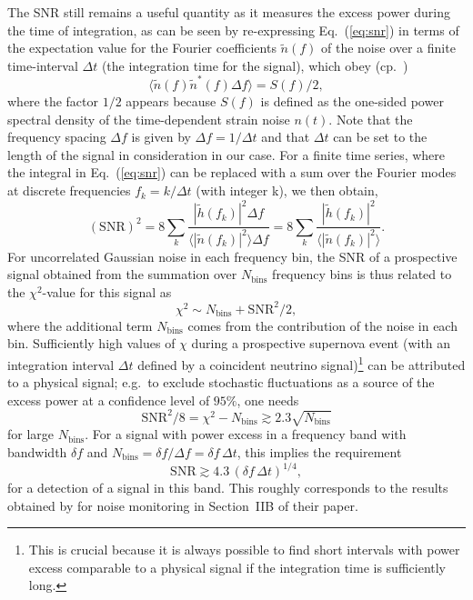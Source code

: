 The SNR still remains a
useful quantity as it measures the excess power during the time of
integration, as can be seen by re-expressing Eq.~(\ref{eq:snr}) in
terms of the expectation value for the Fourier coefficients
$\tilde{n}(f)$ of the noise over a finite time-interval $\Delta t$
(the integration time for the signal),
which obey (cp.\ \citealp{logue_12})
\begin{equation}
\langle\tilde{n}(f)\tilde{n}^*(f) \Delta f\rangle=S(f)/2,
\end{equation}
where the factor $1/2$ appears because $S(f)$ is defined as the one-sided power
spectral density of the time-dependent strain noise $n(t)$.
Note that the frequency spacing $\Delta f$ is given by $\Delta f=
1/\Delta t$ and that $\Delta t$ can be set to the length of the
signal in consideration in our case.
For a finite time series, where the integral in 
Eq.~(\ref{eq:snr}) can be replaced with a sum over the Fourier modes
at discrete frequencies $f_k=k/\Delta t$ (with integer k), we then obtain,
\begin{equation}
(\mathrm{SNR})^2=
8\sum_k \frac{|\tilde{h}(f_k)|^2 \Delta f}{\langle |\tilde{n}(f_k)|^2\rangle \Delta f}
=8\sum_k \frac{|\tilde{h}(f_k)|^2 }{\langle |\tilde{n}(f_k)|^2\rangle}.
\end{equation}
For uncorrelated Gaussian noise in each frequency bin, the SNR of a
prospective signal obtained from the summation over $N_\mathrm{bins}$
frequency bins is thus related to the $\chi^2$-value for this signal
as
\begin{equation}
\chi^2\sim N_\mathrm{bins}+\mathrm{SNR}^2/2,
\end{equation}
where the additional term $N_\mathrm{bins}$ comes from the
contribution of the noise in each bin. Sufficiently high values of
$\chi$ during a prospective supernova event (with an integration
interval  $\Delta t$ defined by a coincident neutrino signal)\footnote{This is
  crucial because it is always possible to find short intervals with
  power excess comparable to a physical signal if the integration time
  is sufficiently long.} can be attributed to a physical signal;
e.g.\ to exclude stochastic fluctuations as a source of the excess
power at a confidence level of $95\%$, one needs
\begin{equation}
\label{eq:snr_band1} 
\mathrm{SNR}^2/8=\chi^2-N_\mathrm{bins} \gtrsim 2.3 \sqrt{N_\mathrm{bins}}
\end{equation}
for large $N_\mathrm{bins}$. For a signal with power excess
in a frequency band with bandwidth $\delta f$ and $N_\mathrm{bins}=\delta f/\Delta f= \delta f\, \Delta t$,
this implies the requirement
\begin{equation}
\label{eq:snr_band2}
\mathrm{SNR} \gtrsim 4.3 \, (\delta f\, \Delta t)^{1/4},
\end{equation}
for a detection of a signal in this band. This roughly corresponds to
the results obtained by \citet{flanagan_98a} for noise monitoring in
Section~IIB of their paper.

